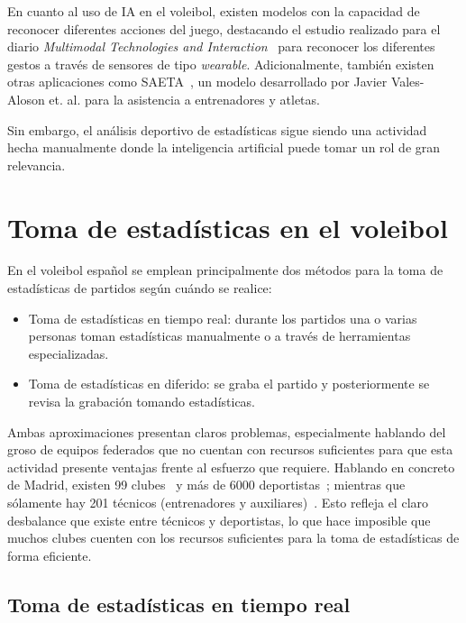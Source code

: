 \documentclass[12pt]{report} %
\begin{document}
    En cuanto al uso de IA en el voleibol, existen modelos con la capacidad de
    reconocer diferentes acciones del juego, destacando el estudio realizado
    para el diario \textit{Multimodal Technologies and
    Interaction}~\cite{wearable} para reconocer los diferentes gestos a través
    de sensores de tipo \textit{wearable}. Adicionalmente, también existen
    otras aplicaciones como SAETA~\cite{SAETA}, un modelo desarrollado por
    Javier Vales-Aloson et. al. para  la asistencia a entrenadores y atletas.


    Sin embargo, el análisis deportivo de estadísticas sigue siendo una
    actividad hecha manualmente donde la inteligencia artificial puede tomar un
    rol de gran relevancia.


    \section{Toma de estadísticas en el voleibol}
    En el voleibol español se emplean principalmente dos
    métodos para la toma de estadísticas de partidos según cuándo se realice:
    \begin{itemize}
        \item Toma de estadísticas en tiempo real: durante los partidos una o
        varias personas toman estadísticas manualmente o a través de
        herramientas especializadas.
        \item Toma de estadísticas en diferido: se graba el partido y
        posteriormente se revisa la grabación tomando estadísticas.
    \end{itemize}

    Ambas aproximaciones presentan claros problemas, especialmente hablando del
    groso de equipos federados que no cuentan con recursos suficientes para que
    esta actividad presente ventajas frente al esfuerzo que requiere. Hablando
    en concreto de Madrid, existen 99 clubes~\cite{directorio-clubes} y más de
    6000 deportistas~\cite{estadisticasFEVB}; mientras que sólamente hay
    201 técnicos (entrenadores y auxiliares)~\cite{estadisticasFEVB}. Esto
    refleja el claro desbalance que existe entre técnicos y deportistas, lo que
    hace imposible que muchos clubes cuenten con los recursos suficientes para
    la toma de estadísticas de forma eficiente.

    \subsection{Toma de estadísticas en tiempo real}
    
\end{document}
